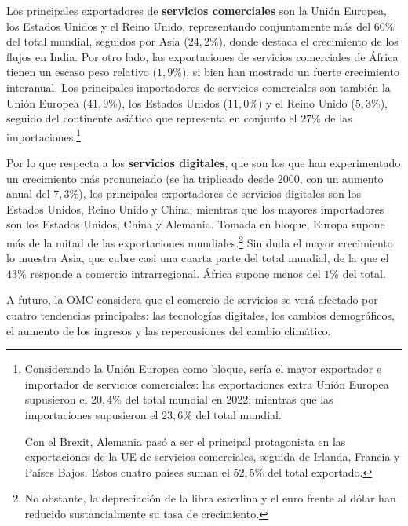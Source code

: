 \documentclass[10pt,a4paper]{article}
\begin{document}
Los principales exportadores de \textbf{servicios comerciales} son la Unión Europea, los Estados Unidos y el Reino Unido, representando conjuntamente más del $60\%$ del total mundial, seguidos por Asia  ($24,2\%$), donde destaca el crecimiento de los flujos en India. Por otro lado, las exportaciones de servicios comerciales de África tienen un escaso peso relativo ($1,9\%$), si bien han mostrado un fuerte crecimiento interanual. Los principales importadores de servicios comerciales son también la Unión Europea ($41,9\%$), los Estados Unidos ($11,0\%$) y el Reino Unido ($5,3\%$), seguido del continente asiático que representa en conjunto el $27\%$ de las importaciones.\footnote{%
    Considerando la Unión Europea como bloque, sería el mayor exportador e importador de servicios comerciales: las exportaciones extra Unión Europea supusieron el $20,4\%$ del total mundial en 2022; mientras que las importaciones supusieron el $23,6\%$ del total mundial. 

Con el Brexit, Alemania pasó a ser el principal protagonista en las exportaciones de la UE de servicios comerciales, seguida de Irlanda, Francia y Países Bajos. Estos cuatro países suman el $52,5\%$ del total exportado.
}

Por lo que respecta a los \textbf{servicios digitales}, que son los que han experimentado un crecimiento más pronunciado (se ha triplicado desde 2000, con un aumento anual del $7,3\%$), los principales exportadores de servicios digitales son los Estados Unidos, Reino Unido y China; mientras que los mayores importadores son los Estados Unidos, China y Alemania. Tomada en bloque, Europa supone más de la mitad de las exportaciones mundiales.\footnote{%
    No obstante, la depreciación de la libra esterlina y el euro frente al dólar han reducido sustancialmente su tasa de crecimiento.
} Sin duda el mayor crecimiento lo muestra Asia, que cubre casi una cuarta parte del total mundial, de la que el $43\%$ responde a comercio intrarregional. África supone menos del $1\%$ del total.

A futuro, la OMC considera que el comercio de servicios se verá afectado por cuatro tendencias principales: las tecnologías digitales, los cambios demográficos, el aumento de los ingresos y las repercusiones del cambio climático.
\end{document}
